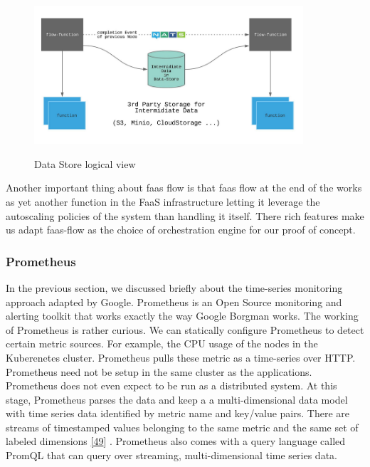 \documentclass[12pt,titlepage]{article}
\begin{document}
\begin{figure}[!h]
    \caption{Data Store logical view}
    \centering
    \includegraphics[width=100mm]{./thesis_images/datastore.png}
    \label{fig:datastore}
\end{figure}

Another important thing about faas flow is that faas flow at the end of the
works as yet another function in the FaaS infrastructure letting it leverage the
autoscaling policies of the system than handling it itself. There rich features
make us adapt faas-flow as the choice of orchestration engine for our proof of concept.

\subsubsection{Prometheus}
\label{sec:orgf510957}
In the previous section, we discussed briefly about the time-series monitoring
approach adapted by Google. Prometheus is an Open Source monitoring and alerting
toolkit that works exactly the way Google Borgman works. The working of
Prometheus is rather curious. We can statically configure Prometheus to detect
certain metric sources. For example, the CPU usage of the nodes in the
Kuberenetes cluster. Prometheus pulls these metric as a time-series over HTTP.
Prometheus need not be setup in the same cluster as the applications. Prometheus
does not even expect to be run as a distributed system. At this stage, Prometheus
parses the data and keep a a multi-dimensional data model with time series data
identified by metric name and key/value pairs. There are streams of timestamped
values belonging to the same metric and the same set of labeled dimensions \hyperref[ref:49]{[49}]
. Prometheus also comes with a query language called PromQL that can
query over streaming, multi-dimensional time series data.
\end{document}
